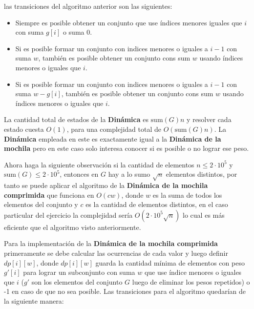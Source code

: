\documentclass{article}
\begin{document}
las transiciones del algoritmo anterior son las siguientes:

\begin{itemize}
    \item Siempre es posible obtener un conjunto que use índices menores iguales que $i$ con suma $g[i]$ o suma 0.
    \item Si es posible formar un conjunto con indices menores o iguales a $i - 1$ con suma $w$, también es posible
          obtener un conjunto cons sum $w$ usando índices menores o iguales que $i$.
    \item Si es posible formar un conjunto con indices menores o iguales a $i - 1$ con suma $w - g[i]$, también es posible
          obtener un conjunto cons sum $w$ usando índices menores o iguales que $i$.
\end{itemize}
La cantidad total de estados de la \textbf{Dinámica} es $\text{sum}(G)n$ y resolver cada estado cuesta $O(1)$, para
una complejidad total de $O(\text{sum}(G)n)$. La \textbf{Dinámica} empleada en este
es exactamente igual a la \textbf{Dinámica de la mochila} pero en este caso solo interesa conocer si es posible o no lograr ese peso.

Ahora haga la siguiente observación si la cantidad de elementos $n\leq 2\cdot 10^5$ y $\text{sum}(G) \leq 2\cdot 10^5$, entonces en $G$ hay a lo sumo $\sqrt{n}$ elementos distintos,
por tanto se puede aplicar el algoritmo de la \textbf{Dinámica de la mochila comprimida} que funciona en $O(cw)$, donde $w$ es la suma de
todos los elementos del conjunto y $c$ es la cantidad de elementos distintos, en el caso particular del ejercicio la complejidad sería $O(2\cdot 10^5\sqrt{n})$
lo cual es más eficiente que el algoritmo visto anteriormente.

Para la implementación de la \textbf{Dinámica de la mochila comprimida} primeramente se debe calcular las ocurrencias de cada valor y luego
definir $dp[i][w]$, donde $dp[i][w]$ guarda la cantidad mínima de elementos con peso $g'[i]$ para lograr un subconjunto con suma $w$ que use
índice menores o iguales que $i$ ($g'$ son los elementos del conjunto $G$ luego de eliminar los pesos repetidos) o -1 en caso de que no sea posible.
Las transiciones para el algoritmo quedarían de la siguiente manera:
\end{document}
